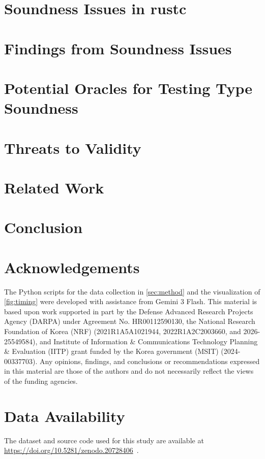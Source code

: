 \documentclass[acmsmall]{acmart}   %
\begin{document}
\section{Soundness Issues in rustc}
\label{sec:bugs}


\section{Findings from Soundness Issues}
\label{sec:findings}


\section{Potential Oracles for Testing Type Soundness}
\label{sec:oracles}


\section{Threats to Validity}
\label{sec:validity}


\section{Related Work}
\label{sec:related}


\section{Conclusion}
\label{conclusion}


\section*{Acknowledgements}
The Python scripts for the data collection in \cref{sec:method} and the visualization of \cref{fig:timing} were developed with assistance from Gemini 3 Flash.
%
This material is based upon work supported in part by
%
the Defense Advanced Research Projects Agency (DARPA) under Agreement No.
HR00112590130,
%
the National Research Foundation of Korea (NRF) (2021R1A5A1021944,
2022R1A2C2003660, and 2026-25549584), and
%
Institute of Information \& Communications Technology Planning \& Evaluation
(IITP) grant funded by the Korea government (MSIT) (2024-00337703).
%
Any opinions, findings, and conclusions or recommendations expressed in this
material are those of the authors and do not necessarily reflect the views of
the funding agencies.

\section*{Data Availability}
The dataset and source code used for this study are available at \url{https://doi.org/10.5281/zenodo.20728406}~\cite{artifact}.



\end{document}

